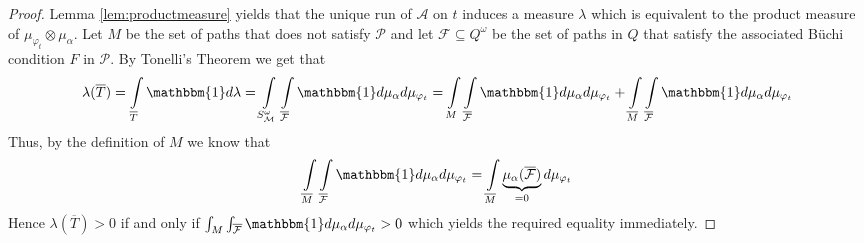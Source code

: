 \begin{proof}
  Lemma \ref{lem:productmeasure} yields that the unique run of $\mathcal{A}$ on
  $t$ induces a measure $\lambda$ which is equivalent to the product measure of
  $\mu_{\varphi_{t}}\otimes\mu_{\alpha}$. Let $M$ be the set of paths that does
  not satisfy $\mathcal{P}$ and let $\mathcal{F}\subseteq Q^{\omega}$ be the
  set of paths in $Q$ that satisfy the associated Büchi condition $F$ in
  $\mathcal{P}$. By Tonelli's Theorem \cite[Theorem 23.6]{Bauer} we get that
  \begin{equation*}
    \lambda(\overline{T}) = \int\limits_{\overline{T}}\mathbbm{1}d\lambda =
    \int\limits_{S_{\mathcal{M}}^{\omega}}\int\limits_{\overline{\mathcal{F}}}
    \mathbbm{1}d\mu_{\alpha}d\mu_{\varphi_{t}} =
    \int\limits_{M}\int\limits_{\overline{\mathcal{F}}}
    \mathbbm{1}d\mu_{\alpha}d\mu_{\varphi_{t}} +
    \int\limits_{\overline{M}}\int\limits_{\overline{\mathcal{F}}}
    \mathbbm{1}d\mu_{\alpha}d\mu_{\varphi_{t}}
  \end{equation*}
  Thus, by the definition of $M$ we know that
  \begin{equation*}
    \int\limits_{\overline{M}}\int\limits_{\overline{\mathcal{F}}}\mathbbm{1}d\mu_{\alpha}d\mu_{\varphi_{t}}
    =\int\limits_{\overline{M}} \underbrace{\mu_{\alpha}(\overline{\mathcal{F}})}_{=0}d\mu_{\varphi_{t}}
  \end{equation*}
  Hence $\lambda(\overline{T}) > 0$ if and only if
  $\int_{M}\int_{\overline{\mathcal{F}}}\mathbbm{1}d\mu_{\alpha}
  d\mu_{\varphi_{t}} > 0$ which yields the required equality immediately.
\end{proof}
